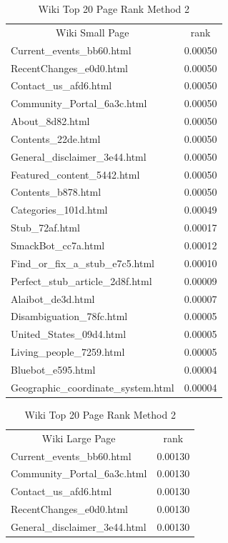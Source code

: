 \documentclass[11pt]{article}
\begin{document}
\begin{table}[h]
\centering
\caption{Wiki Top 20 Page Rank Method 2}
\label{tb:wpr2} 
\begin{minipage}{.5\textwidth}
\begin{tabular}{lc|}
\multicolumn{1}{c}{Wiki Small Page} & \multicolumn{1}{c|}{rank} \\
Current\_events\_bb60.html & 0.00050 \\
RecentChanges\_e0d0.html & 0.00050 \\
Contact\_us\_afd6.html & 0.00050 \\
Community\_Portal\_6a3c.html & 0.00050 \\
About\_8d82.html & 0.00050 \\
Contents\_22de.html & 0.00050 \\
General\_disclaimer\_3e44.html & 0.00050 \\
Featured\_content\_5442.html & 0.00050 \\
Contents\_b878.html & 0.00050 \\
Categories\_101d.html & 0.00049 \\
Stub\_72af.html & 0.00017 \\
SmackBot\_cc7a.html & 0.00012 \\
Find\_or\_fix\_a\_stub\_e7c5.html & 0.00010 \\
Perfect\_stub\_article\_2d8f.html & 0.00009 \\
Alaibot\_de3d.html & 0.00007 \\
Disambiguation\_78fc.html & 0.00005 \\
United\_States\_09d4.html & 0.00005 \\
Living\_people\_7259.html & 0.00005 \\
Bluebot\_e595.html & 0.00004 \\
Geographic\_coordinate\_system.html & 0.00004
\end{tabular}
 \end{minipage}%
    \begin{minipage}{0.5\textwidth}
    \begin{tabular}{lc}
\multicolumn{1}{c}{Wiki Large Page} & rank \\
Current\_events\_bb60.html & 0.00130 \\
Community\_Portal\_6a3c.html & 0.00130 \\
Contact\_us\_afd6.html & 0.00130 \\
RecentChanges\_e0d0.html & 0.00130 \\
General\_disclaimer\_3e44.html & 0.00130 \\

\end{tabular}
\end{minipage}
\end{table}
\end{document}

